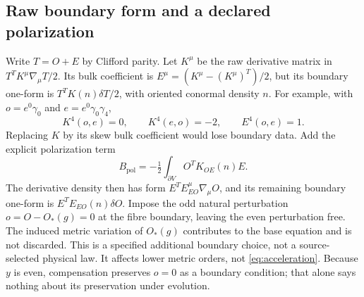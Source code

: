 \subsection{Raw boundary form and a declared polarization}
Write $T=O+E$ by Clifford parity. Let $K^\mu$ be the raw derivative matrix
in $T^TK^\mu\nabla_\mu T/2$. Its bulk coefficient is
$E^\mu=(K^\mu-(K^\mu)^T)/2$, but its boundary one-form is
$T^TK(n)\delta T/2$, with oriented conormal density $n$.
For example, with $o=e^0\gamma_0$ and $e=e^0\gamma_0\gamma_4$,
\begin{equation}
 K^4(o,e)=0,\qquad K^4(e,o)=-2,\qquad E^4(o,e)=1.
 \label{eq:rawboundary}
\end{equation}
Replacing $K$ by its skew bulk coefficient would lose boundary data.
Add the explicit polarization term
\begin{equation}
 B_{\mathrm{pol}}=-\tfrac12\int_{\partial V}O^TK_{OE}(n)E.
 \label{eq:polarization}
\end{equation}
The derivative density then has form $E^TE_{EO}^\mu\nabla_\mu O$,
and its remaining boundary one-form is
$E^TE_{EO}(n)\delta O$.
Impose the odd natural perturbation $o=O-O_*(g)=0$ at the fibre boundary,
leaving the even perturbation free. The induced metric variation of
$O_*(g)$ contributes to the base equation and is not discarded.
This is a specified additional boundary choice, not a source-selected
physical law. It affects lower metric orders, not \eqref{eq:acceleration}.
Because $y$ is even, compensation preserves $o=0$ as a boundary condition;
that alone says nothing about its preservation under evolution.

